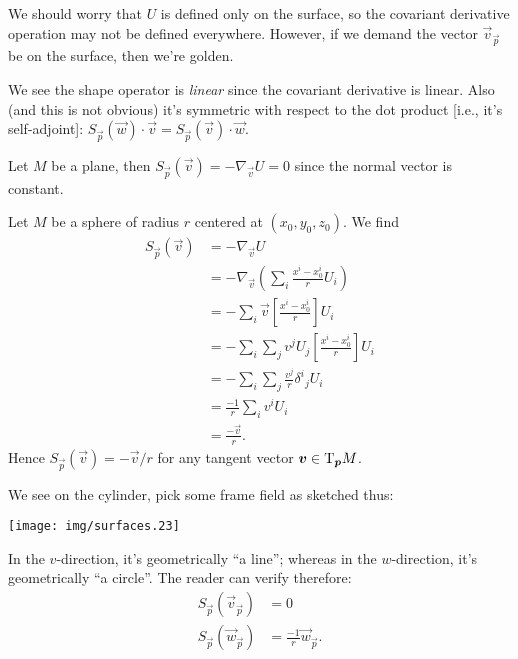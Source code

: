\begin{remark}
We should worry that $U$ is defined only on the surface, so the
covariant derivative operation may not be defined everywhere. However,
if we demand the vector $\vec{v}_{\vec{p}}$ be on the surface, then
we're golden.
\end{remark}

\begin{remark}
We see the shape operator is \emph{linear} since the covariant
derivative is linear. Also (and this is not obvious) it's symmetric with
respect to the dot product [i.e., it's self-adjoint]:
$S_{\vec{p}}(\vec{w})\cdot\vec{v}=S_{\vec{p}}(\vec{v})\cdot\vec{w}$. 
\end{remark}

\begin{example}
Let $M$ be a plane, then $S_{\vec{p}}(\vec{v}) = -\nabla_{\vec{v}}U = 0$
since the normal vector is constant.
\end{example}

\begin{example}
Let $M$ be a sphere of radius $r$ centered at $(x_{0},y_{0},z_{0})$. We
find
\begin{subequations}
\begin{align}
S_{\vec{p}}(\vec{v})
&= -\nabla_{\vec{v}}U\\
&= -\nabla_{\vec{v}}\left(\sum_{i}\frac{x^{i}-x^{i}_{0}}{r}U_{i}\right)\\ 
&= -\sum_{i}\vec{v}\left[\frac{x^{i}-x^{i}_{0}}{r}\right]U_{i}\\
&= -\sum_{i}\sum_{j}v^{j}U_{j}\left[\frac{x^{i}-x^{i}_{0}}{r}\right]U_{i}\\
&= -\sum_{i}\sum_{j}\frac{v^{j}}{r}{\delta^{i}}_{j}U_{i}\\
&= \frac{-1}{r}\sum_{i}v^{i}U_{i}\\
&= \frac{-\vec{v}}{r}.
\end{align}
\end{subequations}
Hence $S_{\vec{p}}(\vec{v}) = -\vec{v}/r$ for any tangent vector $\boldsymbol{v}\in\mathrm{T}_{\boldsymbol{p}}M$.
\end{example}

\begin{example}\label{ex:shape-operator:cylinder}
  We see on the cylinder, pick some frame field as sketched thus:
  \begin{center}
    \texttt{[image: img/surfaces.23]}
  \end{center}
  In the $v$-direction, it's geometrically ``a line''; whereas in the
  $w$-direction, it's geometrically ``a circle''. The reader can verify
  therefore:
  \begin{subequations}
    \begin{align}
      S_{\vec{p}}(\vec{v}_{\vec{p}}) &= 0\\
      S_{\vec{p}}(\vec{w}_{\vec{p}}) &= \frac{-1}{r}\vec{w}_{\vec{p}}.
    \end{align}
  \end{subequations}
\end{example}

